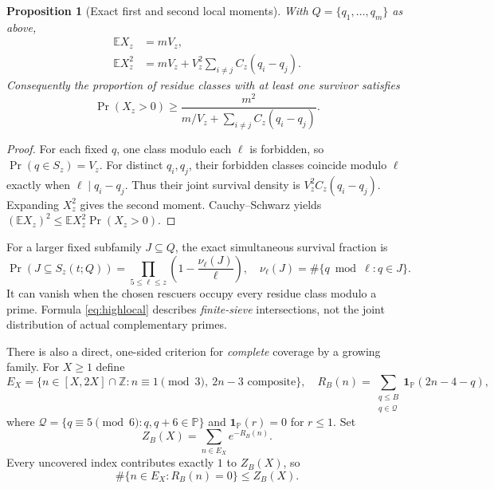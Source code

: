 \documentclass[11pt,a4paper]{article}
\newtheorem{proposition}[theorem]{Proposition}
\theoremstyle{definition}
\newcommand{\PP}{\mathbb P}
\newcommand{\Qcal}{\mathcal Q}
\newcommand{\one}{\mathbf 1}
\begin{document}
\begin{proposition}[Exact first and second local moments]
With $Q=\{q_1,\ldots,q_m\}$ as above,
\begin{align}
 \mathbb E X_z&=mV_z,\\
 \mathbb E X_z^2&=mV_z+
     V_z^2\sum_{i\ne j}C_z(q_i-q_j).
\end{align}
Consequently the proportion of residue classes with at least one
survivor satisfies
\begin{equation}\label{eq:paley}
 \Pr(X_z>0)\ge
 \frac{m^2}{m/V_z+\sum_{i\ne j}C_z(q_i-q_j)}.
\end{equation}
\end{proposition}
\begin{proof}
For each fixed $q$, one class modulo each $\ell$ is forbidden, so
$\Pr(q\in S_z)=V_z$. For distinct $q_i,q_j$, their forbidden classes
coincide modulo $\ell$ exactly when $\ell\mid q_i-q_j$.
Thus their joint survival density is
$V_z^2C_z(q_i-q_j)$. Expanding $X_z^2$ gives the second moment.
Cauchy--Schwarz yields
$(\mathbb E X_z)^2\le\mathbb E X_z^2\Pr(X_z>0)$.
\end{proof}

For a larger fixed subfamily $J\subseteq Q$, the exact simultaneous
survival fraction is
\begin{equation}\label{eq:highlocal}
 \Pr(J\subseteq S_z(t;Q))=
 \prod_{5\le\ell\le z}\left(1-\frac{\nu_\ell(J)}\ell\right),
\quad
 \nu_\ell(J)=\#\{q\bmod\ell:q\in J\}.
\end{equation}
It can vanish when the chosen rescuers occupy every residue class
modulo a prime. Formula \eqref{eq:highlocal} describes
\emph{finite-sieve} intersections, not the joint distribution of
actual complementary primes.

There is also a direct, one-sided criterion for \emph{complete}
coverage by a growing family.  For $X\ge1$ define
\[
 E_X=\{n\in[X,2X]\cap\mathbb Z:
      n\equiv1\pmod3,\ 2n-3\text{ composite}\},
\quad
 R_B(n)=\sum_{\substack{q\le B\\q\in\Qcal}}
              \one_{\PP}(2n-4-q),
\]
where $\Qcal=\{q\equiv5\pmod6:q,q+6\in\PP\}$ and
$\one_{\PP}(r)=0$ for $r\le1$.  Set
\begin{equation}\label{eq:Z}
 Z_B(X)=\sum_{n\in E_X}e^{-R_B(n)}.
\end{equation}
Every uncovered index contributes exactly $1$ to $Z_B(X)$, so
\begin{equation}\label{eq:Zbound}
 \#\{n\in E_X:R_B(n)=0\}\le Z_B(X).
\end{equation}
\end{document}
